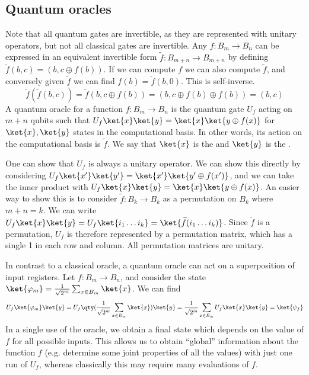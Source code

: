 \subsection{Quantum oracles}
Note that all quantum gates are invertible, as they are represented with unitary operators, but not all classical gates are invertible.
Any $f \colon B_m \to B_n$ can be expressed in an equivalent invertible form $\widetilde f \colon B_{m+n} \to B_{m+n}$ by defining $\widetilde f(b,c) = (b, c \oplus f(b))$.
If we can compute $f$ we can also compute $\widetilde f$, and conversely given $\widetilde f$ we can find $f(b) = \widetilde f(b, 0)$.
This is self-inverse.
\[ \widetilde f(\widetilde f(b,c)) = \widetilde f(b, c \oplus f(b)) = (b, c \oplus f(b) \oplus f(b)) = (b, c) \]
A quantum oracle for a function $f \colon B_m \to B_n$ is the quantum gate $U_f$ acting on $m + n$ qubits such that $U_f \ket{x} \ket{y} = \ket{x} \ket{y \oplus f(x)}$ for $\ket{x}, \ket{y}$ states in the computational basis.
In other words, its action on the computational basis is $\widetilde f$.
We say that $\ket{x}$ is the  and $\ket{y}$ is the .

One can show that $U_f$ is always a unitary operator.
We can show this directly by considering $U_f \ket{x'}\ket{y'} = \ket{x'}\ket{y' \oplus f(x')}$, and we can take the inner product with $U_f \ket{x} \ket{y} = \ket{x} \ket{y \oplus f(x)}$.
An easier way to show this is to consider $\widetilde f \colon B_k \to B_k$ as a permutation on $B_k$ where $m + n = k$.
We can write $U_f \ket{x} \ket{y} = U_f \ket{i_1 \dots i_k} = \ket{\widetilde f(i_1 \dots i_k)}$.
Since $\widetilde f$ is a permutation, $U_f$ is therefore represented by a permutation matrix, which has a single 1 in each row and column.
All permutation matrices are unitary.

In contrast to a classical oracle, a quantum oracle can act on a superposition of input registers.
Let $f \colon B_m \to B_n$, and consider the  state $\ket{\varphi_m} = \frac{1}{\sqrt{2^m}} \sum_{x \in B_m} \ket{x}$.
We can find
\[ U_f \ket{\varphi_m} \ket{y} = U_f \qty( \frac{1}{\sqrt{2^m}} \sum_{x \in B_m} \ket{x}) \ket{y} = \frac{1}{\sqrt{2^m}} \sum_{x \in B_m} U_f \ket{x} \ket{y} = \ket{\psi_f} \]
In a single use of the oracle, we obtain a final state which depends on the value of $f$ for all possible inputs.
This allows us to obtain ``global'' information about the function $f$ (e.g. determine some joint properties of all the values) with just one run of $U_f$, whereas classically this may require many evaluations of $f$.

